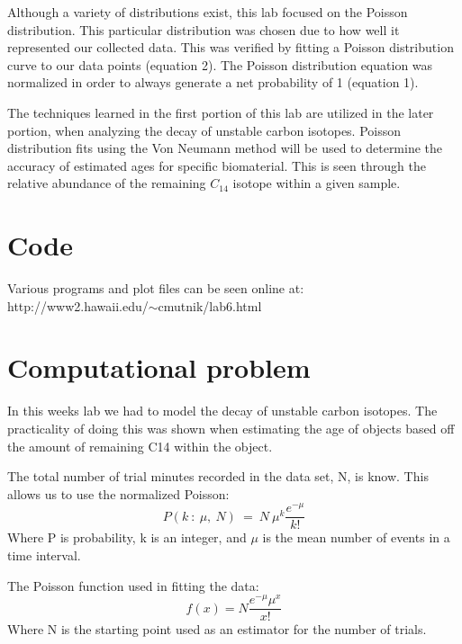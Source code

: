 \documentclass[11pt]{article}
\begin{document}
Although a variety of distributions exist, this lab focused on the Poisson distribution.  This particular 
distribution was chosen due to how well it represented our collected data.  This was verified by fitting a 
Poisson distribution curve to our data points (equation 2).  The Poisson distribution equation was normalized in order to 
always generate a net probability of 1 (equation 1).



The techniques learned in the first portion of this lab are utilized in the later portion, when analyzing 
the decay of unstable carbon isotopes.  Poisson distribution fits using the Von Neumann method will be used to determine the 
accuracy of estimated ages for specific biomaterial.  This is seen through the relative abundance of the remaining $C_{14}$ 
isotope within a given sample.


\section{Code}

Various programs and plot files can be seen online at: \\
http://www2.hawaii.edu/$\sim$cmutnik/lab6.html


\section{Computational problem}

In this weeks lab we had to model the decay of unstable carbon isotopes.  The practicality of doing this was shown when 
estimating the age of objects based off the amount of remaining C14 within the object.


The total number of trial minutes recorded in the data set, N, is know.  This allows us to use the normalized 
Poisson:\\
\begin{equation}
\label{NormalizedP}
P(k~:~ \mu,~N) ~=~ N~ \mu^k \frac{e^{-\mu}}{k!}
\end{equation}
Where P is probability, k is an integer, and $\mu$ is the mean number of events in a time interval.


The Poisson function used in fitting the data:
\begin{equation}
\label{fit}
f(x) = N\frac{e^{-\mu}\mu^{x}}{x!}
\end{equation}
Where N is the starting point used as an estimator for the number of trials.
\end{document}

